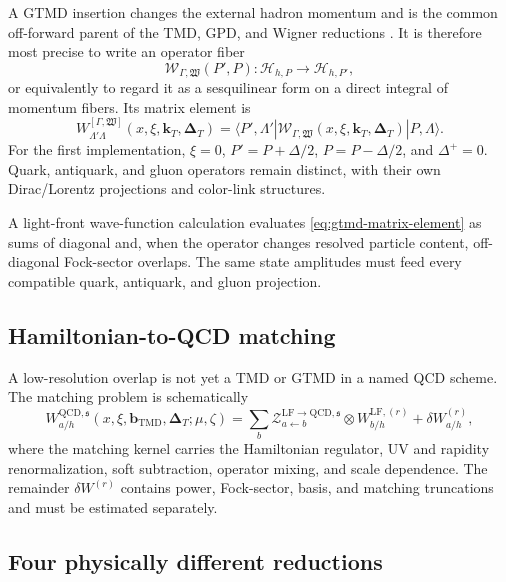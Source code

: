 \documentclass[11pt]{article}
\newcommand{\kT}{\bm{k}_{T}}
\newcommand{\DT}{\bm{\Delta}_{T}}
\newcommand{\bM}{\bm{b}_{\mathrm{TMD}}}
\newcommand{\Hil}{\mathcal H}
\newcommand{\LF}{\mathrm{LF}}
\newcommand{\cW}{\mathcal W}
\newcommand{\cZ}{\mathcal Z}
\begin{document}
A GTMD insertion changes the external hadron momentum and is the common off-forward parent of the TMD, GPD, and Wigner reductions \cite{Meissner2009,Belitsky2004,LorcePasquini2011}.  It is therefore most
precise to write an operator fiber
\begin{equation}
 \cW_{\Gamma,\mathfrak W}(P',P):
 \Hil_{h,P}\longrightarrow\Hil_{h,P'},
\label{eq:gtmd-operator-fiber}
\end{equation}
or equivalently to regard it as a sesquilinear form on a direct integral of
momentum fibers.  Its matrix element is
\begin{equation}
 W_{\Lambda'\Lambda}^{[\Gamma,\mathfrak W]}
 (x,\xi,\kT,\DT)
 =\langle P',\Lambda'|
 \cW_{\Gamma,\mathfrak W}(x,\xi,\kT,\DT)
 |P,\Lambda\rangle.
\label{eq:gtmd-matrix-element}
\end{equation}
For the first implementation, \(\xi=0\),
\(P'=P+\Delta/2\), \(P=P-\Delta/2\), and \(\Delta^+=0\).
Quark, antiquark, and gluon operators remain distinct, with their own
Dirac/Lorentz projections and color-link structures.

A light-front wave-function calculation evaluates
\cref{eq:gtmd-matrix-element} as sums of diagonal and, when the operator
changes resolved particle content, off-diagonal Fock-sector overlaps.  The
same state amplitudes must feed every compatible quark, antiquark, and gluon
projection.

\subsection{Hamiltonian-to-QCD matching}

A low-resolution overlap is not yet a TMD or GTMD in a named QCD scheme.  The
matching problem is schematically
\begin{equation}
 W_{a/h}^{\mathrm{QCD},\mathfrak s}
 (x,\xi,\bM,\DT;\mu,\zeta)
 =\sum_b
 \cZ_{a\leftarrow b}^{\LF\to\mathrm{QCD},\mathfrak s}
 \otimes
 W_{b/h}^{\LF,(r)}
 +\delta W_{a/h}^{(r)},
\label{eq:lf-to-qcd-gtmd-matching}
\end{equation}
where the matching kernel carries the Hamiltonian regulator, UV and rapidity
renormalization, soft subtraction, operator mixing, and scale dependence.
The remainder \(\delta W^{(r)}\) contains power, Fock-sector, basis, and
matching truncations and must be estimated separately.

\subsection{Four physically different reductions}
\end{document}
